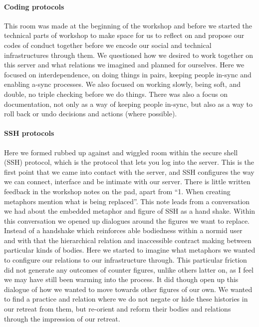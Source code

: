 \hypertarget{coding-protocols}{%
\paragraph{Coding protocols}\label{coding-protocols}}

This room was made at the beginning of the workshop and before we
started the technical parts of workshop to make space for us to reflect
on and propose our codes of conduct together before we encode our social
and technical infrastructures through them. We questioned how we desired
to work together on this server and what relations we imagined and
planned for ourselves. Here we focused on interdependence, on doing
things in pairs, keeping people in-sync and enabling a-sync processes.
We also focused on working slowly, being soft, and double, no triple
checking before we do things. There was also a focus on documentation,
not only as a way of keeping people in-sync, but also as a way to roll
back or undo decisions and actions (where possible).

\hypertarget{ssh-protocols}{%
\paragraph{SSH protocols}\label{ssh-protocols}}

Here we formed rubbed up against and wiggled room within the secure
shell (SSH) protocol, which is the protocol that lets you log into the
server. This is the first point that we came into contact with the
server, and SSH configures the way we can connect, interface and be
intimate with our server. There is little written feedback in the
workshop notes on the pad, apart from ``1. When creating metaphors
mention what is being replaced''. This note leads from a conversation we
had about the embedded metaphor and figure of SSH as a hand shake.
Within this conversation we opened up dialogues around the figures we
want to replace. Instead of a handshake which reinforces able bodiedness
within a normid user and with that the hierarchical relation and
inaccessible contract making between particular kinds of bodies. Here we
started to imagine what metaphors we wanted to configure our relations
to our infrastructure through. This particular friction did not generate
any outcomes of counter figures, unlike others latter on, as I feel we
may have still been warming into the process. It did though open up this
dialogue of how we wanted to move towards other figures of our own. We
wanted to find a practice and relation where we do not negate or hide
these histories in our retreat from them, but re-orient and reform their
bodies and relations through the impression of our retreat.

